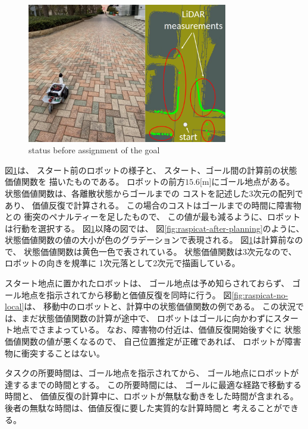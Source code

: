 \documentclass{jarticle}
\begin{document}
\begin{figure}[bt]
  \centering
   \includegraphics[height=61mm]{./figs/raspicat-start.png}
	\caption{status before assignment of the goal}
	\label{fig:raspicat-start}
\end{figure}

図\ref{fig:raspicat-start}は、
スタート前のロボットの様子と、
スタート、ゴール間の計算前の状態価値関数を
描いたものである。
ロボットの前方$15.6$[m]にゴール地点がある。
状態価値関数は、各離散状態からゴールまでの
コストを記述した3次元の配列であり、
価値反復で計算される。
この場合のコストはゴールまでの時間に障害物との
衝突のペナルティーを足したもので、
この値が最も減るように、ロボットは行動を選択する。
図\ref{fig:raspicat-start}以降の図では、
図\ref{fig:raspicat-after-planning}のように、
状態価値関数の値の大小が色のグラデーションで表現される。
図\ref{fig:raspicat-start}は計算前なので、
状態価値関数は黄色一色で表されている。
状態価値関数は3次元なので、ロボットの向きを規準に
1次元落として2次元で描画している。



スタート地点に置かれたロボットは、
ゴール地点は予め知らされておらず、
ゴール地点を指示されてから移動と価値反復を同時に行う。
図\ref{fig:raspicat-no-local}は、
移動中のロボットと、計算中の状態価値関数の例である。
この状況では、まだ状態価値関数の計算が途中で、
ロボットはゴールに向かわずにスタート地点でさまよっている。
なお、障害物の付近は、価値反復開始後すぐに
状態価値関数の値が悪くなるので、
自己位置推定が正確であれば、
ロボットが障害物に衝突することはない。

タスクの所要時間は、ゴール地点を指示されてから、
ゴール地点にロボットが達するまでの時間とする。
この所要時間には、
ゴールに最適な経路で移動する時間と、
価値反復の計算中に、ロボットが無駄な動きをした時間が含まれる。
後者の無駄な時間は、価値反復に要した実質的な計算時間と
考えることができる。
\end{document}
